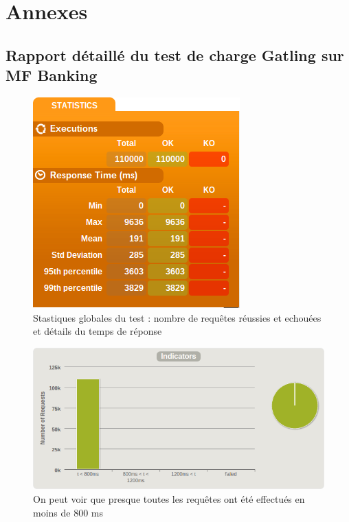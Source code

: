\section{Annexes}

\subsection{Rapport détaillé du test de charge Gatling sur MF Banking}

\begin{figure}[h!]
	\centering
		\includegraphics[scale=0.5]{global.png}
	\caption{Stastiques globales du test : nombre de requêtes réussies et echouées et détails du temps de réponse}
\end{figure}

\begin{figure}[h!]
	\centering
		\includegraphics[scale=0.5]{indicators.png}
	\caption{On peut voir que presque toutes les requêtes ont été effectués en moins de 800 ms}
\end{figure}

